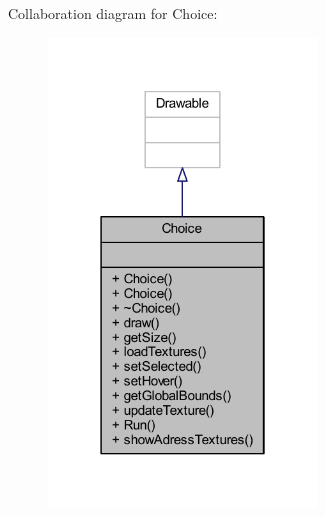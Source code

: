 Collaboration diagram for Choice\+:\nopagebreak
\begin{figure}[H]
\begin{center}
\leavevmode
\includegraphics[width=202pt]{class_choice__coll__graph}
\end{center}
\end{figure}
